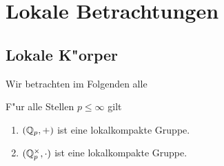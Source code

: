 \section{Lokale Betrachtungen}
\subsection{Lokale K"orper}
	Wir betrachten im Folgenden alle 
	\begin{satz}\label{satz:QpIstLokalKompakt}
		F"ur alle Stellen $p\leq\infty$ gilt
		\begin{enumerate}[label=(\roman*)]
		\item $({\mathbb{Q}_p}, +)$ ist eine lokalkompakte Gruppe.
		\item $(\mathbb{Q}_p^\times, \cdot)$ ist eine lokalkompakte Gruppe.
		\end{enumerate}
	\end{satz}

